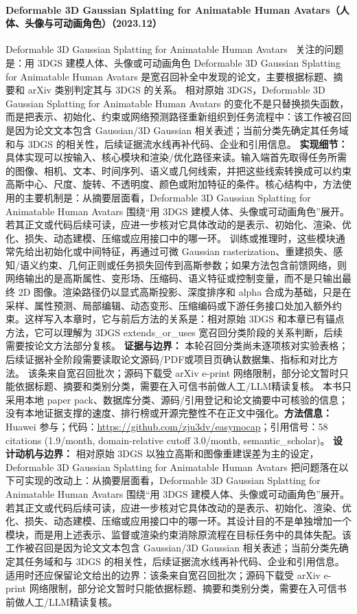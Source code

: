 \paragraph{Deformable 3D Gaussian Splatting for Animatable Human Avatars（人体、头像与可动画角色）（2023.12）}
Deformable 3D Gaussian Splatting for Animatable Human Avatars~\cite{2312_15059} 关注的问题是：用 3DGS 建模人体、头像或可动画角色 Deformable 3D Gaussian Splatting for Animatable Human Avatars 是宽召回补全中发现的论文，主要根据标题、摘要和 arXiv 类别判定其与 3DGS 的关系。
相对原始 3DGS，Deformable 3D Gaussian Splatting for Animatable Human Avatars 的变化不是只替换损失函数，而是把表示、初始化、约束或网络预测路径重新组织到任务流程中：该工作被召回是因为论文文本包含 Gaussian/3D Gaussian 相关表述；当前分类先确定其任务域和与 3DGS 的相关性，后续证据流水线再补代码、企业和引用信息。
\textbf{实现细节：} 具体实现可以按输入、核心模块和渲染/优化路径来读。输入端首先取得任务所需的图像、相机、文本、时间序列、语义或几何线索，并把这些线索转换成可以约束高斯中心、尺度、旋转、不透明度、颜色或附加特征的条件。核心结构中，方法使用的主要机制是：从摘要层面看，Deformable 3D Gaussian Splatting for Animatable Human Avatars 围绕“用 3DGS 建模人体、头像或可动画角色”展开。若其正文或代码后续可读，应进一步核对它具体改动的是表示、初始化、渲染、优化、损失、动态建模、压缩或应用接口中的哪一环。 训练或推理时，这些模块通常先给出初始化或中间特征，再通过可微 Gaussian rasterization、重建损失、感知/语义约束、几何正则或任务损失回传到高斯参数；如果方法包含前馈网络，则网络输出的是高斯属性、变形场、压缩码、语义特征或控制变量，而不是只输出最终 2D 图像。渲染路径仍以显式高斯投影、深度排序和 alpha 合成为基础，只是在采样、属性预测、局部编辑、动态变形、压缩编码或下游任务接口处加入额外约束。这样写入本章时，它与前后方法的关系是：相对原始 3DGS 和本章已有锚点方法，它可以理解为 3DGS extends\_or\_uses 宽召回分类阶段的关系判断，后续需要按论文方法部分复核。
\textbf{证据与边界：} 本轮召回分类尚未逐项核对实验表格；后续证据补全阶段需要读取论文源码/PDF或项目页确认数据集、指标和对比方法。 该条来自宽召回批次；源码下载受 arXiv e-print 网络限制，部分论文暂时只能依据标题、摘要和类别分类，需要在入可信书前做人工/LLM精读复核。 本书只采用本地 paper pack、数据库分类、源码/引用登记和论文摘要中可核验的信息；没有本地证据支撑的速度、排行榜或开源完整性不在正文中强化。\textbf{方法信息：} Huawei 参与；代码：\url{https://github.com/zju3dv/easymocap}；引用信号：58 citations (1.9/month, domain-relative cutoff 3.0/month, semantic\_scholar)。
\textbf{设计动机与边界：} 相对原始 3DGS 以独立高斯和图像重建误差为主的设定，Deformable 3D Gaussian Splatting for Animatable Human Avatars 把问题落在以下可实现的改动上：从摘要层面看，Deformable 3D Gaussian Splatting for Animatable Human Avatars 围绕“用 3DGS 建模人体、头像或可动画角色”展开。若其正文或代码后续可读，应进一步核对它具体改动的是表示、初始化、渲染、优化、损失、动态建模、压缩或应用接口中的哪一环。其设计目的不是单独增加一个模块，而是用上述表示、监督或渲染约束消除原流程在目标任务中的具体失配。该工作被召回是因为论文文本包含 Gaussian/3D Gaussian 相关表述；当前分类先确定其任务域和与 3DGS 的相关性，后续证据流水线再补代码、企业和引用信息。适用时还应保留论文给出的边界：该条来自宽召回批次；源码下载受 arXiv e-print 网络限制，部分论文暂时只能依据标题、摘要和类别分类，需要在入可信书前做人工/LLM精读复核。
